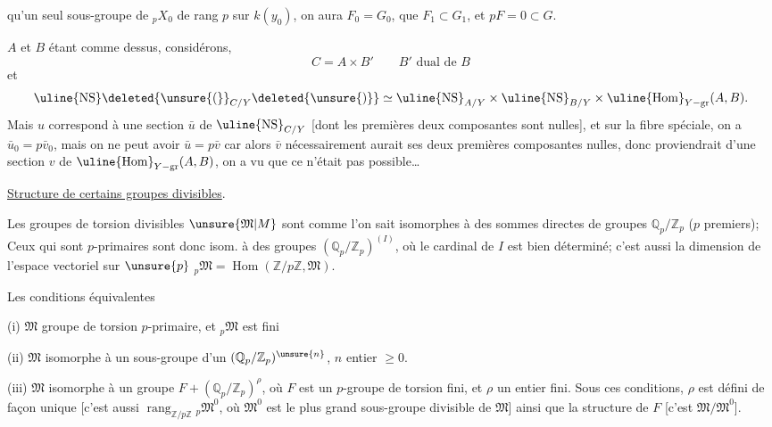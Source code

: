 qu'un seul sous-groupe  de ${}_pX_0$ de rang $p$ sur $k(y_0)$, on aura $F_0=G_0$,  que $F_1\subset G_1$, et $pF=0\subset G$.

$A$ et $B$ étant comme dessus, considérons,
\[
C=A\times B'\qquad B'\text{ dual de }B
\]
et
\[
\uline{\operatorname{NS}}\deleted{\unsure{(}}_{C/Y}\deleted{\unsure{)}}\simeq\uline{\operatorname{NS}}_{A/Y}\times\uline{\operatorname{NS}}_{B/Y}\times\uline{\operatorname{Hom}}_{Y-\mathrm{gr}}(A,B).
\]
Mais $u$ correspond à une section $\bar u$ de $\uline{\operatorname{NS}}_{C/Y}$ [dont les premières deux composantes sont nulles], et sur la fibre  spéciale, on a $\bar u_0=p\bar v_0$, mais on ne peut avoir $\bar u=p\bar v$ car alors $\bar v$ nécessairement aurait ses deux premières composantes nulles, donc proviendrait d'une section $v$ de $\uline{\operatorname{Hom}}_{Y-\mathrm{gr}}(A,B)$, on a vu que ce n'était pas possible\ldots
{}

\uline{Structure de certains groupes divisibles}.

 Les groupes de torsion divisibles $\unsure{\mathfrak M|M}$ sont comme l'on sait isomorphes à des sommes directes de groupes $\mathbb Q_p/\mathbb Z_p$ ($p$ premiers); Ceux qui sont $p$-primaires sont donc isom. à des  groupes $(\mathbb Q_p/\mathbb Z_p)^{(I)}$, où le cardinal de $I$ est bien déterminé; c'est aussi la dimension de l'espace vectoriel sur $\unsure{p}$ ${}_p\mathfrak M=\operatorname{Hom}(\mathbb Z/p\mathbb Z,\mathfrak M)$.

Les conditions équivalentes

(i) $\mathfrak M$ groupe de torsion $p$-primaire, et ${}_p\mathfrak M$ est fini

(ii) $\mathfrak M$ isomorphe à un sous-groupe d'un $(\mathbb Q_p/\mathbb Z_p)^{\unsure{n}}$,  $n$ entier $\geq0$.

(iii) $\mathfrak M$ isomorphe à un groupe $F+(\mathbb Q_p/\mathbb Z_p)^{\rho}$, où $F$ est un $p$-groupe de torsion fini, et $\rho$ un entier fini.
Sous ces conditions, $\rho$ est défini de façon unique [c'est aussi $\operatorname{rang}_{\mathbb Z/p\mathbb Z}{}_p\mathfrak M^0$, où $\mathfrak M^0$ est le plus grand sous-groupe divisible de $\mathfrak M$] ainsi que la structure de $F$ [c'est $\mathfrak M/\mathfrak M^0$].

